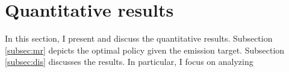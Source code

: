 \section{Quantitative results}\label{sec:res}

In this section, I present and discuss the quantitative results.
Subsection \ref{subsec:mr} depicts the optimal policy given the emission target. Subsection \ref{subsec:dis} discusses the results. In particular, I focus on analyzing 